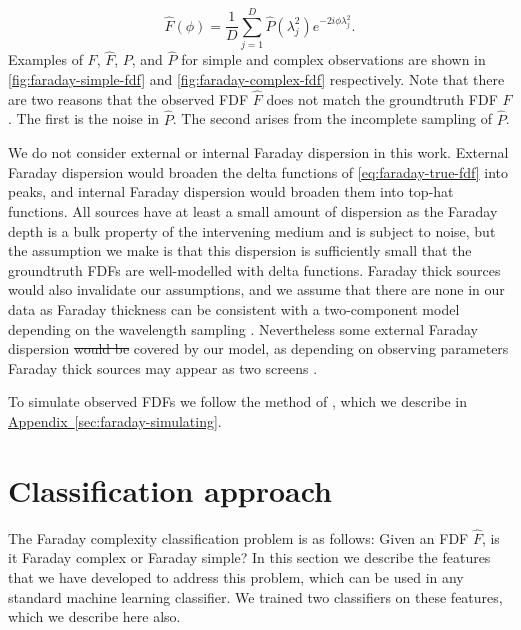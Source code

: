 \documentclass[11pt, a4paper]{book}
\newcommand{\aref}[1]{\hyperref[#1]{Appendix~\ref{#1}}}
\providecommand{\DIFaddtex}[1]{{\protect\color{blue}\uwave{#1}}} %
\providecommand{\DIFdeltex}[1]{{\protect\color{red}\sout{#1}}}                      %
\providecommand{\DIFaddbegin}{} %
\providecommand{\DIFaddend}{} %
\providecommand{\DIFdelbegin}{} %
\providecommand{\DIFdelend}{} %
\providecommand{\DIFadd}[1]{\texorpdfstring{\DIFaddtex{#1}}{#1}} %
\providecommand{\DIFdel}[1]{\texorpdfstring{\DIFdeltex{#1}}{}} %
\newcommand{\DIFscaledelfig}{0.5}
\newlength{\DIFdelgraphicswidth} %
\newlength{\DIFdelgraphicsheight} %
\newcommand{\DIFaddincludegraphics}[2][]{{\color{blue}\fbox{\DIFOincludegraphics[#1]{#2}}}} %
\newcommand{\DIFdelincludegraphics}[2][]{%
\sbox{\DIFdelgraphicsbox}{\DIFOincludegraphics[#1]{#2}}%
\settoboxwidth{\DIFdelgraphicswidth}{\DIFdelgraphicsbox} %
\settoboxtotalheight{\DIFdelgraphicsheight}{\DIFdelgraphicsbox} %
\scalebox{\DIFscaledelfig}{%
\parbox[b]{\DIFdelgraphicswidth}{\usebox{\DIFdelgraphicsbox}\\[-\baselineskip] \rule{\DIFdelgraphicswidth}{0em}}\llap{\resizebox{\DIFdelgraphicswidth}{\DIFdelgraphicsheight}{%
\setlength{\unitlength}{\DIFdelgraphicswidth}%
\begin{picture}(1,1)%
\thicklines\linethickness{2pt} %
{\color[rgb]{1,0,0}\put(0,0){\framebox(1,1){}}}%
{\color[rgb]{1,0,0}\put(0,0){\line( 1,1){1}}}%
{\color[rgb]{1,0,0}\put(0,1){\line(1,-1){1}}}%
\end{picture}%
}\hspace*{3pt}}} %
} %
\DeclareRobustCommand{\DIFaddbegin}{\DIFOaddbegin \let\includegraphics\DIFaddincludegraphics} %
\DeclareRobustCommand{\DIFaddend}{\DIFOaddend \let\includegraphics\DIFOincludegraphics} %
\DeclareRobustCommand{\DIFdelbegin}{\DIFOdelbegin \let\includegraphics\DIFdelincludegraphics} %
\DeclareRobustCommand{\DIFdelend}{\DIFOaddend \let\includegraphics\DIFOincludegraphics} %
\begin{document}
    \begin{equation}
      \label{eq:faraday-rm-synthesis}
      \hat F(\phi) = \frac{1}{D} \sum_{j = 1}^D \hat P(\lambda^2_j) e^{-2i\phi\lambda^2_j}.
    \end{equation}
    Examples of $F$, $\hat F$, $P$, and $\hat P$ for simple and complex observations are shown in \autoref{fig:faraday-simple-fdf} and \autoref{fig:faraday-complex-fdf} respectively. Note that there are two reasons that the observed FDF $\hat F$ does not match the groundtruth FDF $F$. The first is the noise in $\hat P$. The second arises from the incomplete sampling of $\hat P$.

    We do not consider external or internal Faraday dispersion in this work. External Faraday dispersion would broaden the delta functions of \autoref{eq:faraday-true-fdf} into peaks, and internal Faraday dispersion would broaden them into top-hat functions. All sources have at least a small amount of dispersion as the Faraday depth is a bulk property of the intervening medium and is subject to noise, but the assumption we make is that this dispersion is sufficiently small that the groundtruth FDFs are well-modelled with delta functions. Faraday thick sources would also invalidate our assumptions, and we assume that there are none in our data as Faraday thickness can be consistent with a two-component model depending on the wavelength sampling \citep[e.g.][]{ma_broad-band_2019,brentjens_faraday_2005}. Nevertheless some external Faraday dispersion \DIFdelbegin \DIFdel{would be }\DIFdelend \DIFaddbegin \DIFadd{is }\DIFaddend covered by our model, as depending on observing parameters Faraday thick sources may appear as two screens \citep{van_eck_faraday_2017}.

    To simulate observed FDFs we follow the method of \citet{brown_classifying_2018}, which we describe in \DIFdelbegin %
\DIFdelend \DIFaddbegin \aref{sec:faraday-simulating}\DIFaddend .

\section{Classification approach}
\label{sec:faraday-approach}

  The Faraday complexity classification problem is as follows: Given an FDF $\hat F$, is it Faraday complex or Faraday simple? In this section we describe the features that we have developed to address this problem, which can be used in any standard machine learning classifier. We trained two classifiers on these features, which we describe here also.
\end{document}
